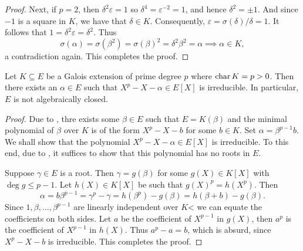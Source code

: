 \begin{proof}
    Next, if $p = 2$, then $\delta^2\varepsilon = 1$ so $\delta^4 = \varepsilon^{-2} = 1$, and hence $\delta^2 = \pm 1$. And since $-1$ is a square in $K$, we have that $\delta\in K$. Consequently, $\varepsilon = \sigma(\delta)/\delta = 1$. It follows that $1 = \delta^2\varepsilon = \delta^2$. Thus 
    \begin{equation*}
        \sigma(\alpha) = \sigma(\beta^2) = \sigma(\beta)^2 = \delta^2\beta^2 = \alpha\implies\alpha\in K,
    \end{equation*}
    a contradiction again. This completes the proof.
\end{proof}

\begin{theorem}
    Let $K\subseteq E$ be a Galois extension of prime degree $p$ where $\operatorname{char} K = p > 0$. Then there exists an $\alpha\in E$ such that $X^p - X - \alpha\in E[X]$ is irreducible. In particular, $E$ is not algebraically closed.
\end{theorem}
\begin{proof}
    Due to , thre exists some $\beta\in E$ such that $E = K(\beta)$ and the minimal polynomial of $\beta$ over $K$ is of the form $X^p - X - b$ for some $b\in K$. Set $\alpha = \beta^{p - 1}b$. We shall show that the polynomial $X^p - X - \alpha\in E[X]$ is irreducible. To this end, due to , it suffices to show that this polynomial has no roots in $E$. 

    Suppose $\gamma\in E$ is a root. Then $\gamma = g(\beta)$ for some $g(X)\in K[X]$ with $\deg g \le p - 1$. Let $h(X)\in K[X]$ be such that $g(X)^p = h(X^p)$. Then 
    \begin{equation*}
        \alpha = b\beta^{p - 1} = \gamma^p - \gamma = h(\beta^p) - g(\beta) = h(\beta + b) - g(\beta).
    \end{equation*}
    Since $1,\beta,\dots,\beta^{p - 1}$ are linearly independent over $K$< we can equate the coefficients on both sides. Let $a$ be the coefficient of $X^{p - 1}$ in $g(X)$, then $a^p$ is the coefficient of $X^{p - 1}$ in $h(X)$. Thus $a^p - a = b$, which is absurd, since $X^p - X - b$ is irreducible. This completes the proof.
\end{proof}

